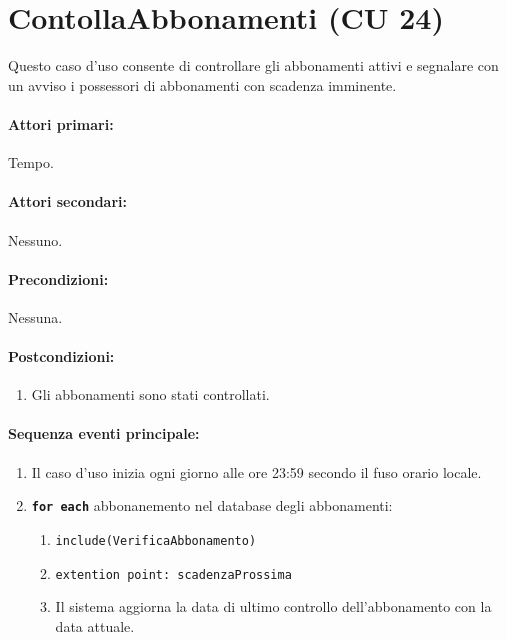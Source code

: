 \documentclass{article}
\begin{document}
\newpage
	
	
	
	
	
	
	
	
	
	
	
	
	
	
	
\section*{ContollaAbbonamenti (CU 24)}
    
  \indent\indent   Questo caso d'uso consente di controllare gli abbonamenti attivi e segnalare con un avviso i possessori di abbonamenti con scadenza imminente.
    
    \paragraph{Attori primari:}Tempo.
	
	\paragraph{Attori secondari:}Nessuno.
	
	\paragraph{Precondizioni:}Nessuna.
	
	\paragraph{Postcondizioni:}
        \begin{enumerate}	[leftmargin=28pt]
		\item Gli abbonamenti sono stati controllati.
        \end{enumerate}
	
	\paragraph{Sequenza eventi principale:}
\begin{enumerate}[itemsep=8pt,parsep=0pt]
    
    \item
    Il caso d’uso inizia ogni giorno alle ore 23:59 secondo il fuso orario locale.
    
    \item\texttt{\textbf{for each}} abbonanemento nel database degli abbonamenti:
        \begin{enumerate}	[leftmargin=28pt]
			    \item   \texttt{include(VerificaAbbonamento)}
			    \item \texttt{extention point: scadenzaProssima}
			\item Il sistema aggiorna la data di ultimo controllo dell'abbonamento con la data attuale.
                
			    
         \end{enumerate}
	\end{enumerate}
    
\end{document}
